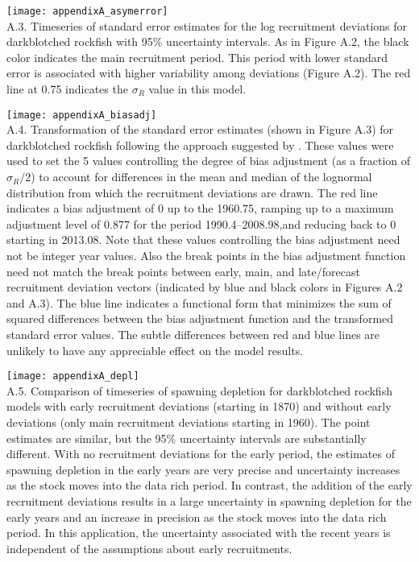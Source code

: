 \texttt{[image: appendixA\_asymerror]}\\
\figurename{ A.3. Timeseries of standard error estimates for the log recruitment deviations for darkblotched rockfish with 95\% uncertainty intervals. As in Figure A.2, the black color indicates the main recruitment period. This period with lower standard error is associated with higher variability among deviations (Figure A.2). The red line at 0.75 indicates the  $\sigma_R$ value in this model.}

\texttt{[image: appendixA\_biasadj]}\\
\figurename{ A.4. Transformation of the standard error estimates (shown in Figure A.3) for darkblotched rockfish following the approach suggested by \citet{methot_adjusting_2011}. These values were used to set the 5 values controlling the degree of bias adjustment (as a fraction of  $\sigma_R/2$) to account for differences in the mean and median of the lognormal distribution from which the recruitment deviations are drawn. The red line indicates a bias adjustment of 0 up to the  1960.75, ramping up to a maximum adjustment level of 0.877 for the period 1990.4–2008.98,and reducing back to 0 starting in 2013.08. Note that these values controlling the bias adjustment need not be integer year values. Also the break points in the bias adjustment function need not match the break points between early, main, and late/forecast recruitment deviation vectors (indicated by blue and black colors in Figures A.2 and A.3). The blue line indicates a functional form that minimizes the sum of squared differences between the bias adjustment function and the transformed standard error values. The subtle differences between red and blue lines are unlikely to have any appreciable effect on the model results.}

\texttt{[image: appendixA\_depl]}\\
\figurename{ A.5. Comparison of timeseries of spawning depletion for darkblotched rockfish models with early recruitment deviations (starting in 1870) and without early deviations (only main recruitment deviations starting in 1960). The point estimates are similar, but the 95\% uncertainty intervals are substantially different. With no recruitment deviations for the early period, the estimates of spawning depletion in the early years are very precise and uncertainty increases as the stock moves into the data rich period. In contrast, the addition of the early recruitment deviations results in a large uncertainty in spawning depletion for the early years and an increase in precision as the stock moves into the data rich period. In this application, the uncertainty associated with the recent years is independent of the assumptions about early recruitments.}

